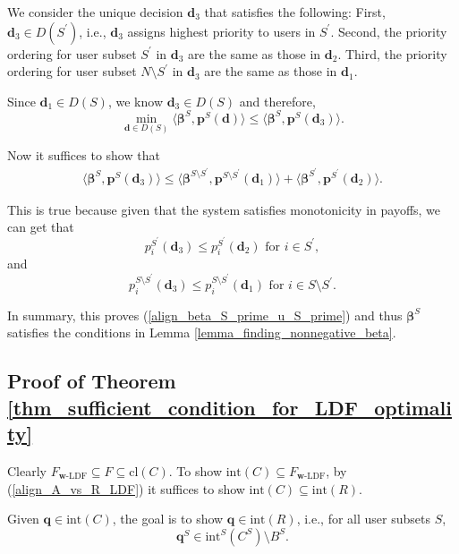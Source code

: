 \documentclass[prodmode,acmtompecs]{acmsmall}
\newcommand{\reqvec}{\mathbf{q}}
\newcommand{\concaveHull}{R}
\newcommand{\feasibilityRegion}{F}
\newcommand{\fullUserSet}{N}
\begin{document}
We consider the unique decision $\mathbf{d}_3$ that satisfies the following: 
First, $\mathbf{d}_3\in D(S^\prime)$, i.e., $\mathbf{d}_3$ assigns highest priority to users in $S^\prime$. 
Second, the priority ordering for user subset $S^\prime$ in $\mathbf{d}_3$ are the same as those in $\mathbf{d}_2$. 
Third, the priority ordering for user subset $\fullUserSet \setminus S^\prime$ in $\mathbf{d}_3$ are the same as those in $\mathbf{d}_1$. 

Since $\mathbf{d}_1 \in D(S)$, we know $\mathbf{d}_3 \in D(S)$ and therefore, 
$$
\min\limits_{\mathbf{d} \in D(S)} \langle \boldsymbol{\beta}^S, \mathbf{p}^S(\mathbf{d}) \rangle \leq \langle \boldsymbol{\beta}^S, \mathbf{p}^S(\mathbf{d}_3) \rangle. 
$$

Now it suffices to show that
\begin{align*}
\langle \boldsymbol{\beta}^S, \mathbf{p}^S(\mathbf{d}_3) \rangle \leq \langle \boldsymbol{\beta}^{S \setminus S^\prime}, \mathbf{p}^{S \setminus S^\prime}(\mathbf{d}_1) \rangle + \langle \boldsymbol{\beta}^{S^\prime},  \mathbf{p}^{S^\prime}(\mathbf{d}_2) \rangle. 
\end{align*}

This is true because given that the system satisfies monotonicity in payoffs, we can get that
$$
p_i^{S^\prime}(\mathbf{d}_3) \leq p_i^{S^\prime}(\mathbf{d}_2) \text{~for~} i \in S^\prime,  
$$
and
$$
p_i^{S\setminus S^\prime}(\mathbf{d}_3) \leq p_i^{S\setminus S^\prime}(\mathbf{d}_1) \text{~for~} i \in S\setminus S^\prime. 
$$

In summary, this proves (\ref{align_beta_S_prime_u_S_prime}) and thus $\boldsymbol{\beta}^S$ satisfies the conditions in Lemma \ref{lemma_finding_nonnegative_beta}. 

\subsection{Proof of Theorem \ref{thm_sufficient_condition_for_LDF_optimality}}
\label{appendix_pf_thm_sufficient_condition_for_LDF_optimality}

Clearly $\feasibilityRegion_{\mathbf{w}\text{-LDF}} \subseteq \feasibilityRegion \subseteq \text{cl}(C)$. 
To show $\text{int}(C) \subseteq \feasibilityRegion_{\mathbf{w}\text{-LDF}}$, by (\ref{align_A_vs_R_LDF}) it suffices to show $\text{int}(C) \subseteq \text{int}(\concaveHull)$. 

Given $\reqvec \in \text{int}(C)$, the goal is to show $\reqvec \in \text{int}(\concaveHull)$, i.e., for all user subsets $S$, 
$$
\reqvec^S \in \text{int}^S(C^S)\setminus B^S. 
$$
\end{document}
